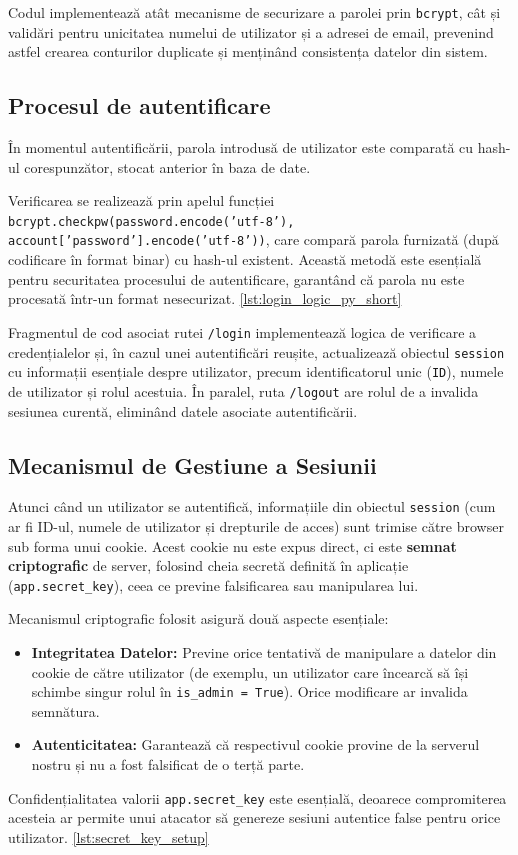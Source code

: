 \documentclass[12pt, a4paper, oneside, romanian]{teza-upb}
\begin{document}
Codul implementează atât mecanisme de securizare a parolei prin \texttt{bcrypt}, cât și validări pentru unicitatea numelui de utilizator și a adresei de email, prevenind astfel crearea conturilor duplicate și menținând consistența datelor din sistem.

\subsection*{Procesul de autentificare}
În momentul autentificării, parola introdusă de utilizator este comparată cu hash-ul corespunzător, stocat anterior în baza de date. 

Verificarea se realizează prin apelul funcției \texttt{bcrypt.checkpw(password.encode('utf-8'), account['password'].encode('utf-8'))}, care compară parola furnizată (după codificare în format binar) cu hash-ul existent. Această metodă este esențială pentru securitatea procesului de autentificare, garantând că parola nu este procesată într-un format nesecurizat. \ref{lst:login_logic_py_short}



Fragmentul de cod asociat rutei \texttt{/login} implementează logica de verificare a credențialelor și, în cazul unei autentificări reușite, actualizează obiectul \texttt{session} cu informații esențiale despre utilizator, precum identificatorul unic (\texttt{ID}), numele de utilizator și rolul acestuia. În paralel, ruta \texttt{/logout} are rolul de a invalida sesiunea curentă, eliminând datele asociate autentificării.


\subsection{Mecanismul de Gestiune a Sesiunii}
Atunci când un utilizator se autentifică, informațiile din obiectul \texttt{session} (cum ar fi ID-ul, numele de utilizator și drepturile de acces) sunt trimise către browser sub forma unui cookie. Acest cookie nu este expus direct, ci este \textbf{semnat criptografic} de server, folosind cheia secretă definită în aplicație (\texttt{app.secret\_key}), ceea ce previne falsificarea sau manipularea lui.


Mecanismul criptografic folosit asigură două aspecte esențiale:
\begin{itemize}
	\item \textbf{Integritatea Datelor:} Previne orice tentativă de manipulare a datelor din cookie de către utilizator (de exemplu, un utilizator care încearcă să își schimbe singur rolul în \texttt{is\_admin = True}). Orice modificare ar invalida semnătura.
	\item \textbf{Autenticitatea:} Garantează că respectivul cookie provine de la serverul nostru și nu a fost falsificat de o terță parte.
\end{itemize}
Confidențialitatea valorii \texttt{app.secret\_key} este esențială, deoarece compromiterea acesteia ar permite unui atacator să genereze sesiuni autentice false pentru orice utilizator. \ref{lst:secret_key_setup}
\end{document}
